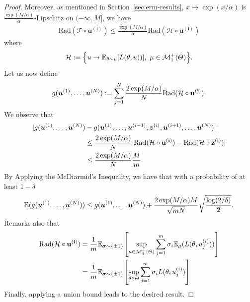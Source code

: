 \begin{proof}
Moreover, as mentioned in Section~\ref{sec:erm-results}, $x\mapsto\exp(x/\alpha)$ is $\frac{\exp(M/\alpha)}{\alpha}$-Lipschitz on $(-\infty,M]$, we have 
\begin{align*}
   \text{Rad}(\mathcal{T}\circ \mathbf{u^{(i)}})\leq \frac{\exp(M/\alpha)}{\alpha} \text{Rad}(\mathcal{H}\circ \mathbf{u^{(i)}}) 
\end{align*}
where 
\begin{align*}
    \mathcal{H}:=\Big\{u\rightarrow \mathbb{E}_{\theta \sim \mu}\left[\loss(\theta,u))\right],~\mu\in\mathcal{M}_{1}^{+}(\Theta) \Big\}.
\end{align*}
Let us now define
\begin{align*}
    g(\bm{u}^{(1)},\dots,\bm{u}^{(N)}):=\sum_{j=1}^N\frac{2\exp(M/\alpha)}{N}\text{Rad}(\mathcal{H}\circ \mathbf{u^{(j)}}).
\end{align*}
We observe that 
\begin{align*}
|g(\bm{u}^{(1)},\dots,\bm{u}^{(N)}) &- g(\bm{u}^{(1)},\dots,\bm{u}^{(i-1)},\bm{z}^{(i)},\bm{u}^{(i+1)},\dots,\bm{u}^{(N)})|\\
&\leq \frac{2\exp(M/\alpha)}{N}|\text{Rad}(\mathcal{H}\circ \mathbf{u^{(i)}}) - \text{Rad}(\mathcal{H}\circ \mathbf{z^{(i)}})|\\
&\leq \frac{2\exp(M/\alpha)}{N}\frac{M}{m}.
\end{align*}
By Applying the McDiarmid’s Inequality, we have that with a probability of at least $1-\delta$
\begin{align*}
\mathbb{E}(g(\bm{u}^{(1)},\dots,\bm{u}^{(N)}))\leq g(\bm{u}^{(1)},\dots,\bm{u}^{(N)}) +\frac{2\exp(M/\alpha)M}{\sqrt{mN}}\sqrt{\frac{\log(2/\delta)}{2}}.
\end{align*}
Remarks also that 
\begin{align*}
    \text{Rad}(\mathcal{H}\circ \mathbf{u^{(i)}})&=\frac{1}{m}\mathbb{E}_{\bm{\sigma}\sim\{\pm 1\}}\left[\sup_{\mu\in\mathcal{M}_1^{+}(\Theta)}\sum_{j=1}^m\sigma_i\mathbb{E}_{\mu}(\loss(\theta,u^{(i)}_j))\right]\\
    &=\frac{1}{m}\mathbb{E}_{\bm{\sigma}\sim\{\pm 1\}}\left[\sup_{\theta\in\Theta}\sum_{j=1}^m\sigma_i \loss(\theta,u^{(i)}_j)\right]
\end{align*}
Finally, applying a union bound leads to the desired result.

\end{proof}




